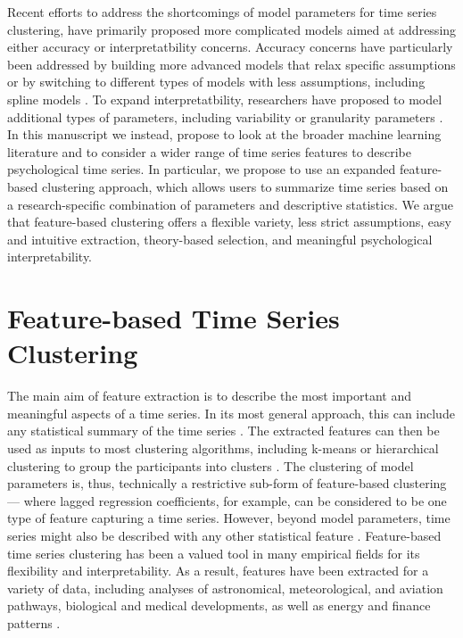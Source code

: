 \documentclass[man, 12pt, a4paper, mask, floatsintext]{apa7}
\theoremstyle{break}
\theoremstyle{plain}
\begin{document}

Recent efforts to address the shortcomings of model parameters for time series clustering, have primarily proposed more complicated models aimed at addressing either accuracy or interpretatbility concerns. Accuracy concerns have particularly been addressed by building more advanced models that relax specific assumptions \citep[e.g.,][]{denteuling2021} or by switching to different types of models with less assumptions, including spline models \citep{axen2011}. To expand interpretatbility, researchers have proposed to model additional types of parameters, including variability or granularity parameters \citep[e.g., see][]{krone2018}. In this manuscript we instead, propose to look at the broader machine learning literature and to consider a wider range of time series features to describe psychological time series. In particular, we propose to use an expanded feature-based clustering approach, which allows users to summarize time series based on a research-specific combination of parameters and descriptive statistics. We argue that feature-based clustering offers a flexible variety, less strict assumptions, easy and intuitive extraction, theory-based selection, and meaningful psychological interpretability.

\section{Feature-based Time Series Clustering}

The main aim of feature extraction is to describe the most important and meaningful aspects of a time series. In its most general approach, this can include any statistical summary of the time series \citep[i.e., feature; e.g.,][]{maharaj2019}. The extracted features can then be used as inputs to most clustering algorithms, including k-means or hierarchical clustering to group the participants into clusters \citep{wang2006}. The clustering of model parameters is, thus, technically a restrictive sub-form of feature-based clustering --- where lagged regression coefficients, for example, can be considered to be one type of feature capturing a time series. However, beyond model parameters, time series might also be described with any other statistical feature \citep{tiano2021}. Feature-based time series clustering has been a valued tool in many empirical fields for its flexibility and interpretability. As a result, features have been extracted for a variety of data, including analyses of astronomical, meteorological, and aviation pathways, biological and medical developments, as well as energy and finance patterns \citep{Aghabozorgi2015}. 
\end{document}
